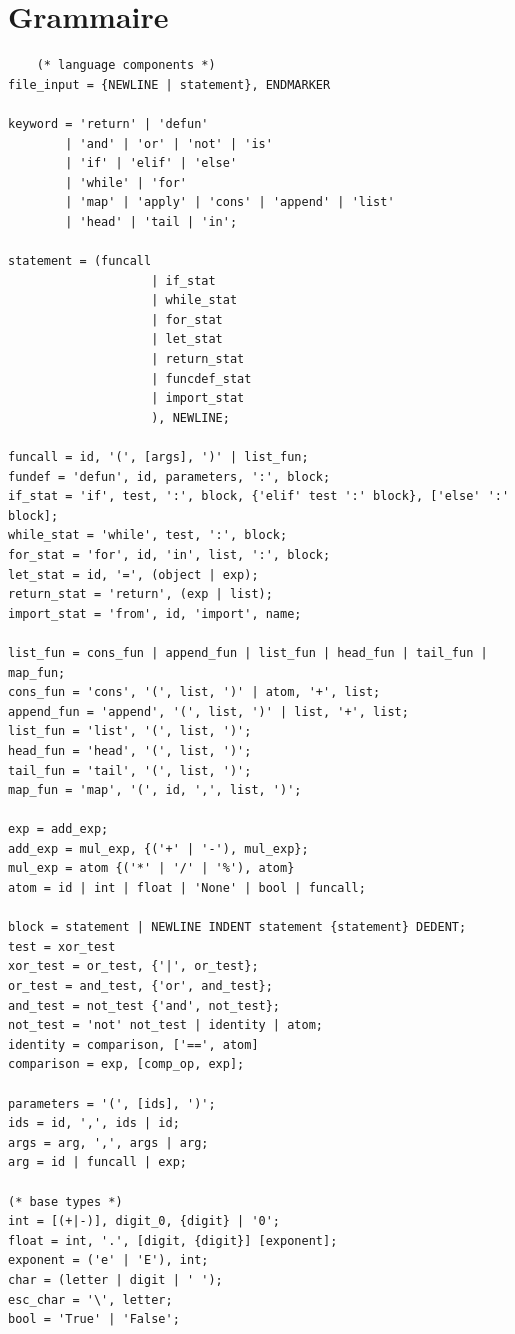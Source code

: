 \documentclass[a4paper,11pt]{article}
\begin{document}
\section{Grammaire}
	\begin{verbatim}
	(* language components *)
file_input = {NEWLINE | statement}, ENDMARKER

keyword = 'return' | 'defun' 
        | 'and' | 'or' | 'not' | 'is' 
        | 'if' | 'elif' | 'else'
        | 'while' | 'for'
        | 'map' | 'apply' | 'cons' | 'append' | 'list' 
        | 'head' | 'tail | 'in';
        
statement = (funcall
                    | if_stat
                    | while_stat
                    | for_stat
                    | let_stat
                    | return_stat
                    | funcdef_stat
                    | import_stat
                    ), NEWLINE;
     
funcall = id, '(', [args], ')' | list_fun;
fundef = 'defun', id, parameters, ':', block;
if_stat = 'if', test, ':', block, {'elif' test ':' block}, ['else' ':' block];
while_stat = 'while', test, ':', block;
for_stat = 'for', id, 'in', list, ':', block;
let_stat = id, '=', (object | exp);
return_stat = 'return', (exp | list);
import_stat = 'from', id, 'import', name;

list_fun = cons_fun | append_fun | list_fun | head_fun | tail_fun | map_fun;
cons_fun = 'cons', '(', list, ')' | atom, '+', list;
append_fun = 'append', '(', list, ')' | list, '+', list;
list_fun = 'list', '(', list, ')';
head_fun = 'head', '(', list, ')';
tail_fun = 'tail', '(', list, ')';
map_fun = 'map', '(', id, ',', list, ')';

exp = add_exp;
add_exp = mul_exp, {('+' | '-'), mul_exp};
mul_exp = atom {('*' | '/' | '%'), atom}
atom = id | int | float | 'None' | bool | funcall;

block = statement | NEWLINE INDENT statement {statement} DEDENT;
test = xor_test
xor_test = or_test, {'|', or_test};
or_test = and_test, {'or', and_test};
and_test = not_test {'and', not_test};
not_test = 'not' not_test | identity | atom;
identity = comparison, ['==', atom]
comparison = exp, [comp_op, exp];

parameters = '(', [ids], ')';
ids = id, ',', ids | id;
args = arg, ',', args | arg;
arg = id | funcall | exp;

(* base types *)
int = [(+|-)], digit_0, {digit} | '0';
float = int, '.', [digit, {digit}] [exponent];
exponent = ('e' | 'E'), int;
char = (letter | digit | ' ');
esc_char = '\', letter;
bool = 'True' | 'False';


\end{verbatim}
\end{document}
